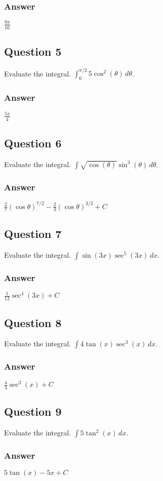 \documentclass{article}
\begin{document}
\subsubsection*{Answer}
$ \frac{9\pi}{16} $

\subsection*{Question 5}
Evaluate the integral. $\int_0^{\pi/2} 5\cos^2(\theta) \,d\theta$.
\subsubsection*{Answer}
$ \frac{5\pi}{4} $

\subsection*{Question 6}
Evaluate the integral. $\int \sqrt{\cos(\theta)}\sin^3(\theta) \,d\theta$.
\subsubsection*{Answer}
$ \frac{2}{7}(\cos\theta)^{7/2} - \frac{2}{3}(\cos\theta)^{3/2} + C $

\subsection*{Question 7}
Evaluate the integral. $\int \sin(3x)\sec^5(3x) \,dx$.
\subsubsection*{Answer}
$ \frac{1}{12}\sec^4(3x) + C $

\subsection*{Question 8}
Evaluate the integral. $\int 4\tan(x)\sec^3(x) \,dx$.
\subsubsection*{Answer}
$ \frac{4}{3}\sec^3(x) + C $

\subsection*{Question 9}
Evaluate the integral. $\int 5\tan^2(x) \,dx$.
\subsubsection*{Answer}
$ 5\tan(x) - 5x + C $
\end{document}
